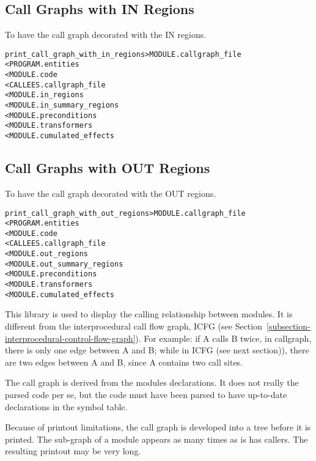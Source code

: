 \documentclass[a4paper]{report}
\newenvironment{PipsMake}{\begin{alltt}}{\end{alltt}}
\newenvironment{PipsPass}[1]{\label{pass:#1}}{}
\begin{document}
\subsection{Call Graphs with IN Regions}

\begin{PipsPass}{print_call_graph_with_in_regions}
To have the call graph decorated with the IN regions.
\end{PipsPass}
\begin{PipsMake}
print_call_graph_with_in_regions         > MODULE.callgraph_file
        < PROGRAM.entities
        < MODULE.code
        < CALLEES.callgraph_file
        < MODULE.in_regions
        < MODULE.in_summary_regions
        < MODULE.preconditions
        < MODULE.transformers
        < MODULE.cumulated_effects
\end{PipsMake}

\subsection{Call Graphs with OUT Regions}

\begin{PipsPass}{print_call_graph_with_out_regions}
To have the call graph decorated with the OUT regions.
\end{PipsPass}
\begin{PipsMake}
print_call_graph_with_out_regions        > MODULE.callgraph_file
        < PROGRAM.entities
        < MODULE.code
        < CALLEES.callgraph_file
        < MODULE.out_regions
        < MODULE.out_summary_regions
        < MODULE.preconditions
        < MODULE.transformers
        < MODULE.cumulated_effects
\end{PipsMake}

This library is used to display the calling relationship between modules.
It is different from the interprocedural call flow graph, ICFG (see
Section~\ref{subsection-interprocedural-control-flow-graph}). For example:
if A calls B twice, in callgraph, there is only one edge between A and B;
while in ICFG (see next section)), there are two edges between A and B,
since A contains two call sites.

The call graph is derived from the modules declarations. It does not
really the parsed code per se, but the code must have been parsed to have
up-to-date declarations in the symbol table.

Because of printout limitations, the call graph is developed into a tree
before it is printed. The sub-graph of a module appears as many times as
is has callers. The resulting printout may be very long.
\end{document}
